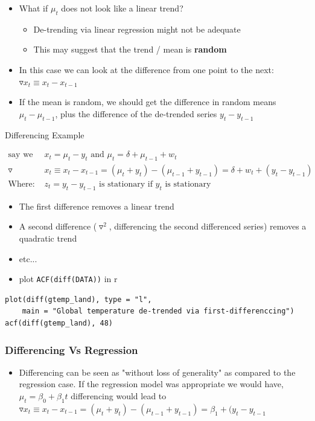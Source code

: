 \documentclass{article}
\begin{document}
\begin{itemize}
    \item What if $\mu_t$ does not look like a linear trend?
    \begin{itemize}
        \item De-trending via linear regression might not be adequate
        \item This may suggest that the trend / mean is \textbf{random}
    \end{itemize}
    \item In this case we can look at the difference from one point to the next: $\triangledown x_t \equiv x_t - x_{t-1}$
    \item If the mean is random, we should get the difference in random means $\mu_t - \mu_{t-1}$, plus the difference of the de-trended series $y_t - y_{t-1}$
\end{itemize}

\noindent Differencing Example

\begin{align*}
    \text{say we have: } &x_t = \mu_t - y_t \text{ and } \mu_t = \delta + \mu_{t-1} + w_t\\
    \triangledown & x_t \equiv x_t - x_{t-1} = (\mu_t + y_t) - (\mu_{t-1} + y_{t-1}) = \delta + w_t + (y_t - y_{t-1})\\
    \text{Where: }& z_t = y_t - y_{t-1} \text{ is stationary if } y_t \text{ is stationary}
\end{align*}
    
\begin{itemize}
    \item The first difference removes a linear trend
    \item A second difference ($\triangledown ^2$, differencing the second differenced series) removes a quadratic trend
    \item etc...
    \item plot  \texttt{ACF(diff(DATA))} in r
\end{itemize}

\begin{lstlisting}
plot(diff(gtemp_land), type = "l", 
    main = "Global temperature de-trended via first-differenccing")
acf(diff(gtemp_land), 48)
\end{lstlisting}


\subsubsection{Differencing Vs Regression}
\begin{itemize}
    \item Differencing can be seen as "without loss of generality" as compared to the regression case.
    If the regression model was appropriate we would have, $\mu_t = \beta_0 + \beta_1 t$ differencing would lead to $\triangledown x_t \equiv x_t - x_{t-1} = (\mu_t + y_t) - (\mu_{t-1} + y_{t-1}) = \beta_1 + (y_t - y_{t-1}$
\end{itemize}
\end{document}
